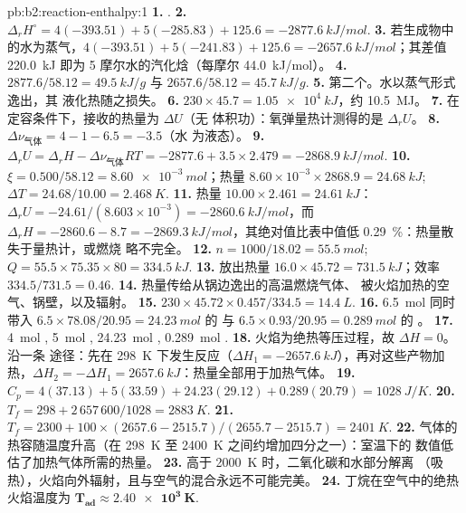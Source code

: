 \begin{solution}{pb:b2:reaction-enthalpy:1}
\textbf{1.} .
\textbf{2.} $\Delta_r H^\circ = 4(-393.51) + 5(-285.83) + 125.6 =
\qty{-2877.6}{kJ/mol}$.
\textbf{3.} 若生成物中的水为蒸气，$4(-393.51) + 5(-241.83) + 125.6 =
\qty{-2657.6}{kJ/mol}$；其差值 \qty{220.0}{kJ} 即为
5 摩尔水的汽化焓（每摩尔 \qty{44.0}{kJ/mol}）。
\textbf{4.} $2877.6/58.12 = \qty{49.5}{kJ/g}$ 与 $2657.6/58.12 =
\qty{45.7}{kJ/g}$.
\textbf{5.} 第二个。水以蒸气形式逸出，其
液化热随之损失。
\textbf{6.} $230 \times 45.7 = \qty{1.05e4}{kJ}$，约 \qty{10.5}{MJ}。
\textbf{7.} 在定容条件下，接收的热量为 $\Delta U$（无
体积功）：氧弹量热计测得的是 $\Delta_r U$。
\textbf{8.} $\Delta\nu_{\text{气体}} = 4 - 1 - 6.5 = -3.5$（水
为液态）。
\textbf{9.} $\Delta_r U = \Delta_r H - \Delta\nu_{\text{气体}}RT = -2877.6 +
3.5 \times 2.479 = \qty{-2868.9}{kJ/mol}$.
\textbf{10.} $\xi = 0.500/58.12 = \qty{8.60e-3}{mol}$；热量 $8.60 \times
10^{-3} \times 2868.9 = \qty{24.68}{kJ}$; $\Delta T = 24.68/10.00 =
\qty{2.468}{K}$.
\textbf{11.} 热量 $10.00 \times 2.461 = \qty{24.61}{kJ}$：$\Delta_r U =
-24.61/(8.603 \times 10^{-3}) = \qty{-2860.6}{kJ/mol}$，而 $\Delta_r H =
-2860.6 - 8.7 = \qty{-2869.3}{kJ/mol}$，其绝对值比表中值低
\qty{0.29}{\percent}：热量散失于量热计，或燃烧
略不完全。
\textbf{12.} $n = 1000/18.02 = \qty{55.5}{mol}$; $Q = 55.5 \times 75.35
\times 80 = \qty{334.5}{kJ}$.
\textbf{13.} 放出热量 $16.0 \times 45.72 = \qty{731.5}{kJ}$；效率
$334.5/731.5 = 0.46$.
\textbf{14.} 热量传给从锅边逸出的高温燃烧气体、
被火焰加热的空气、锅壁，以及辐射。
\textbf{15.} $230 \times 45.72 \times 0.457/334.5 = \qty{14.4}{L}$.
\textbf{16.} \qty{6.5}{mol}  同时带入 $6.5 \times 78.08/20.95 =
\qty{24.23}{mol}$ 的  与 $6.5 \times 0.93/20.95 = \qty{0.289}{mol}$
的 。
\textbf{17.} \qty{4}{mol} , \qty{5}{mol} ,
\qty{24.23}{mol} , \qty{0.289}{mol} .
\textbf{18.} 火焰为绝热等压过程，故 $\Delta H = 0$。沿一条
途径：先在 \qty{298}{K} 下发生反应（$\Delta H_1 =
\qty{-2657.6}{kJ}$），再对这些产物加热，$\Delta H_2 =
-\Delta H_1 = \qty{+2657.6}{kJ}$：热量全部用于加热气体。
\textbf{19.} $C_p = 4(37.13) + 5(33.59) + 24.23(29.12) + 0.289(20.79) =
\qty{1028}{J/K}$.
\textbf{20.} $T_f = 298 + 2\,657\,600/1028 = \qty{2883}{K}$.
\textbf{21.} $T_f = 2300 + 100 \times (2657.6 - 2515.7)/(2655.7 - 2515.7) =
\qty{2401}{K}$.
\textbf{22.} 气体的热容随温度升高（在
\qty{298}{K} 至 \qty{2400}{K} 之间约增加四分之一）：室温下的
数值低估了加热气体所需的热量。
\textbf{23.} 高于 \qty{2000}{K} 时，二氧化碳和水部分解离
（吸热），火焰向外辐射，且与空气的混合永远不可能完美。
\textbf{24.} 丁烷在空气中的绝热火焰温度为
$\boldsymbol{T_{\text{ad}} \approx \qty{2.40e3}{K}}$.
\end{solution}

